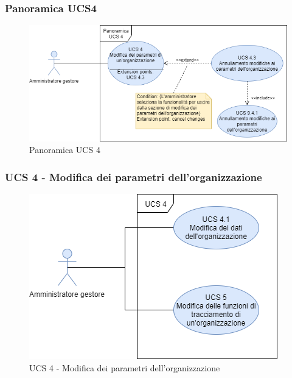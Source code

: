 \subsubsection{Panoramica UCS4}

\begin{figure}[h]
	\centering	
	\includegraphics[scale=0.53]{Sezioni/UseCase/Immagini/PS4.png}
	\caption{Panoramica UCS 4}
\end{figure}

\subsubsection{UCS 4 - Modifica dei parametri dell'organizzazione}%

\begin{figure}[h]
	\centering	
	\includegraphics[scale=0.53]{Sezioni/UseCase/Immagini/UCS4.png}
	\caption{UCS 4 - Modifica dei parametri dell'organizzazione}
\end{figure}

